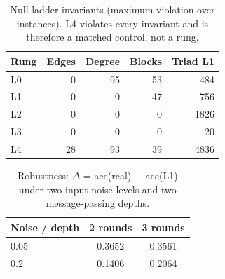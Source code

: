\begin{table}[t]\centering\caption{Null-ladder invariants (maximum violation over instances).
L4 violates every invariant and is therefore a matched control, not a rung.}\label{tab:invariants}\small
\begin{tabular}{lrrrr}\toprule Rung & Edges & Degree & Blocks & Triad L1 \\ \midrule
L0 & 0 & 95 & 53 & 484 \\
L1 & 0 & 0 & 47 & 756 \\
L2 & 0 & 0 & 0 & 1826 \\
L3 & 0 & 0 & 0 & 20 \\
L4 & 28 & 93 & 39 & 4836 \\
\bottomrule\end{tabular}\end{table}

\begin{table}[t]\centering\caption{Robustness: $\Delta$ = acc(real) $-$ acc(L1)
under two input-noise levels and two message-passing depths.}\label{tab:robust}\small
\begin{tabular}{lcc}\toprule Noise / depth & 2 rounds & 3 rounds \\ \midrule
0.05 & 0.3652 & 0.3561 \\
0.2 & 0.1406 & 0.2064 \\
\bottomrule\end{tabular}\end{table}
